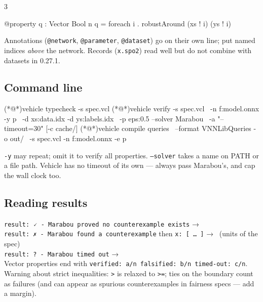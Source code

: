 \documentclass[10pt]{article}
\begin{document}
\begin{multicols}{3}
\begin{vclbox}
@property
q : Vector Bool n
q = foreach i . robustAround (xs ! i) (ys ! i)
\end{vclbox}
Annotations (\texttt{@network}, \texttt{@parameter}, \texttt{@dataset}) go on their own line; put named indices \emph{above} the network. Records (\texttt{x.spo2}) read well but do not combine with datasets in 0.27.1.

\subsection*{Command line}
\begin{shellbox}
(*@\tprompt@*)vehicle typecheck -s spec.vcl
(*@\tprompt@*)vehicle verify -s spec.vcl \
   -n f:model.onnx -y p \
   -d xs:data.idx -d ys:labels.idx \
   -p eps:0.5 --solver Marabou \
   -a "--timeout=30" [-c cache/]
(*@\tprompt@*)vehicle compile queries \
   --format VNNLibQueries -o out/ \
   -s spec.vcl -n f:model.onnx -e p
\end{shellbox}
\texttt{-y} may repeat; omit it to verify all properties. \texttt{--solver} takes a name on PATH or a file path. Vehicle has no timeout of its own — always pass Marabou's, and cap the wall clock too.

\subsection*{Reading results}
\texttt{result: 🗸 - Marabou proved no counterexample exists} → \verified\\[0.5mm]
\texttt{result: ✗ - Marabou found a counterexample} then \texttt{x: [ … ]} → \counterexample\ (units of the spec)\\[0.5mm]
\texttt{result: ? - Marabou timed out} → \unknown\\[0.5mm]
Vector properties end with \texttt{verified: a/n  falsified: b/n  timed-out: c/n}.\\[0.5mm]
Warning about strict inequalities: \texttt{>} is relaxed to \texttt{>=}; ties on the boundary count as failures (and can appear as spurious counterexamples in fairness specs — add a margin).


\end{multicols}
\end{document}
